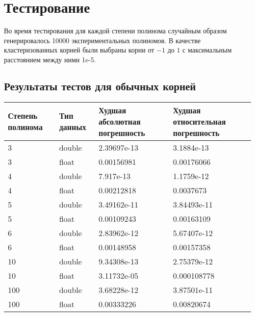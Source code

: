 \documentclass[a4paper,12pt]{article}
\begin{document}
\section{Тестирование}
Во время тестирования для каждой степени полинома случайным образом генерировалось 10000 экспериментальных полиномов. В качестве кластеризованных корней были выбраны корни от $-1$ до $1$ с максимальным расстоянием между ними 1e-5.
\subsection{Результаты тестов для обычных корней}
\begin{center}
  \begin{tabular}{|p{2.5cm}|p{3.0cm}|p{5.0cm}|p{5.0cm}|}
  \hline
  \textbf{Степень полинома}  & \textbf{Тип данных} & \textbf{Худшая абсолютная погрешность} & \textbf{Худшая относительная погрешность} \\
  \hline
  3 & double & 2.39697e-13 & 3.1884e-13 \\
  \hline
  3 & float & 0.00156981 & 0.00176066 \\
  \hline
  4 & double & 7.917e-13 & 1.1759e-12 \\
  \hline
  4 & float & 0.00212818 & 0.0037673 \\
  \hline
  5 & double & 3.49162e-11 & 3.84493e-11 \\
  \hline
  5 & float & 0.00109243 & 0.00163109 \\
  \hline
  6 & double & 2.83962e-12 & 5.67407e-12 \\
  \hline
  6 & float & 0.00148958 & 0.00157358 \\
  \hline
  10 & double & 9.34308e-13 & 2.75379e-12 \\
  \hline
  10 & float & 3.11732e-05 & 0.000108778 \\
  \hline
  100 & double & 3.68228e-12 & 3.87501e-11 \\
  \hline
  100 & float & 0.00333226 & 0.00820674 \\
  \hline
\end{tabular}
\label{tab:my_label_2}
\end{center}
\end{document}
